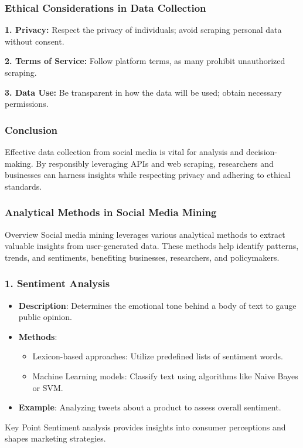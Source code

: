 \documentclass{beamer}
\begin{document}
\begin{frame}[fragile]
    \frametitle{Ethical Considerations in Data Collection}
    
    \textbf{1. Privacy:} Respect the privacy of individuals; avoid scraping personal data without consent.
    
    \textbf{2. Terms of Service:} Follow platform terms, as many prohibit unauthorized scraping.
    
    \textbf{3. Data Use:} Be transparent in how the data will be used; obtain necessary permissions.
\end{frame}

\begin{frame}[fragile]
    \frametitle{Conclusion}
    Effective data collection from social media is vital for analysis and decision-making. 
    By responsibly leveraging APIs and web scraping, researchers and businesses can harness insights while respecting privacy and adhering to ethical standards.
\end{frame}

\begin{frame}[fragile]
    \frametitle{Analytical Methods in Social Media Mining}
    
    \begin{block}{Overview}
        Social media mining leverages various analytical methods to extract valuable insights from user-generated data. These methods help identify patterns, trends, and sentiments, benefiting businesses, researchers, and policymakers.
    \end{block}
\end{frame}

\begin{frame}[fragile]
    \frametitle{1. Sentiment Analysis}
    
    \begin{itemize}
        \item \textbf{Description}: Determines the emotional tone behind a body of text to gauge public opinion.
        \item \textbf{Methods}:
        \begin{itemize}
            \item Lexicon-based approaches: Utilize predefined lists of sentiment words.
            \item Machine Learning models: Classify text using algorithms like Naive Bayes or SVM.
        \end{itemize}
        \item \textbf{Example}: Analyzing tweets about a product to assess overall sentiment.
    \end{itemize}
    
    \begin{block}{Key Point}
        Sentiment analysis provides insights into consumer perceptions and shapes marketing strategies.
    \end{block}
\end{frame}
\end{document}
